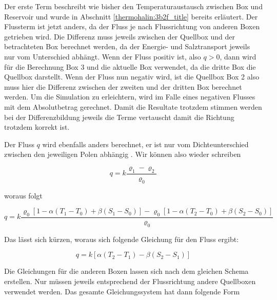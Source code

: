 Der erste Term beschreibt wie bisher den Temperaturaustausch zwischen Box und Reservoir und wurde in  Abschnitt \ref{thermohalin:3b2f_title} bereits erläutert. Der Flussterm ist jetzt anders, da der Fluss je nach Flussrichtung von anderen Boxen getrieben wird. Die Differenz muss jeweils zwischen der Quellbox und der betrachteten Box berechnet werden, da der Energie- und Salztransport jeweils nur vom Unterschied abhängt.
Wenn der Fluss positiv ist, also $q>0$, dann wird für die Berechnung Box 3 und die aktuelle Box verwendet, da die dritte Box die Quellbox darstellt. Wenn der Fluss nun negativ wird, ist die Quellbox Box 2 also muss hier die Differenz zwischen der zweiten und der dritten Box berechnet werden. Um die Simulation zu erleichtern, wird im Falle eines negativen Flusses mit dem Absolutbetrag gerechnet. Damit die Resultate trotzdem stimmen werden  bei der Differenzbildung jeweils die Terme vertauscht damit die Richtung trotzdem korrekt ist. 

Der Fluss $q$ wird ebenfalls anders berechnet, er ist nur vom Dichteunterschied zwischen den jeweiligen Polen abhängig \cite{skript:kaperengler}.
Wir können also wieder schreiben

\begin{equation}
q = k\frac{\varrho_1-\varrho_2}{\varrho_0}
\end{equation}

woraus folgt

\begin{equation}
q= k\frac{\varrho_0[1-\alpha(T_1-T_0)+\beta(S_1-S_0)]-\varrho_0[1-\alpha(T_2-T_0)+\beta(S_2-S_0)]}{\varrho_0}
\end{equation}

Das lässt sich kürzen, woraus sich folgende Gleichung für den Fluss ergibt:

\begin{equation}
q = k[\alpha(T_2-T_1)-\beta(S_2-S_1)] 
\end{equation}

Die Gleichungen für die anderen Boxen lassen sich nach dem gleichen Schema erstellen. Nur müssen jeweils entsprechend der Flussrichtung andere Quellboxen verwendet werden. Das gesamte Gleichungssystem hat dann folgende Form

